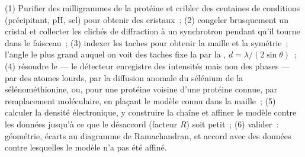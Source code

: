 \begin{method}\label{met:b3:structural-biology:crystallography}
(1) Purifier des milligrammes de la protéine et cribler des centaines
de conditions (précipitant, pH, sel) pour obtenir des cristaux~;
(2) congeler brusquement un cristal et collecter les clichés de
diffraction à un synchrotron pendant qu'il tourne dans le faisceau~;
(3) indexer les taches pour obtenir la maille et la symétrie~; l'angle
le plus grand auquel on voit des taches fixe la  par la , $d =
\lambda/(2\sin\theta)$~; (4) résoudre le \emph{} ---
le détecteur enregistre des intensités mais non des phases --- par des
atomes lourds, par la diffusion anomale du sélénium de la
sélénométhionine, ou, pour une protéine voisine d'une protéine connue,
par remplacement moléculaire, en plaçant le modèle connu dans la
maille~; (5) calculer la densité électronique, y construire la chaîne
et affiner le modèle contre les données jusqu'à ce que le désaccord
(facteur $R$) soit petit~; (6) valider~: géométrie, écarts au
diagramme de Ramachandran, et accord avec des données contre
lesquelles le modèle n'a pas été affiné.
\end{method}

